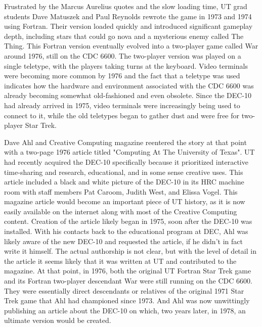 Frustrated by the Marcus Aurelius quotes and the slow loading time, UT grad students Dave Matuszek and Paul Reynolds rewrote the game in 1973 and 1974 using Fortran. Their version loaded quickly and introduced significant gameplay depth, including stars that could go nova and a mysterious enemy called The Thing. This Fortran version eventually evolved into a two-player game called War around 1976, still on the CDC 6600. The two-player version was played on a single teletype, with the players taking turns at the keyboard. Video terminals were becoming more common by 1976 and the fact that a teletype was used indicates how the hardware and environment associated with the CDC 6600 was already becoming somewhat old-fashioned and even obsolete. Since the DEC-10 had already arrived in 1975, video terminals were increasingly being used to connect to it, while the old teletypes began to gather dust and were free for two-player Star Trek.

Dave Ahl and Creative Computing  magazine reentered the story at that point with a two-page 1976 article titled "Computing At The University of Texas". UT had recently acquired the DEC-10 specifically because it prioritized interactive time-sharing and research, educational, and in some sense creative uses. This article included a black and white picture of the DEC-10 in its HRC machine room with staff members Pat Caroom, Judith West, and Elissa Vogel. This magazine article would become an important piece of UT history, as it is now easily available on the internet along with most of the Creative Computing content. Creation of the article likely began in 1975, soon after the DEC-10 was installed. With his contacts back to the educational program at DEC, Ahl was likely aware of the new DEC-10 and requested the article, if he didn’t in fact write it himself. The actual authorship is not clear, but with the level of detail in the article it seems likely that it was written at UT and contributed to the magazine. At that point, in 1976, both the original UT Fortran Star Trek game and its Fortran two-player descendant War were still running on the CDC 6600. They were essentially direct descendants or relatives of the original 1971 Star Trek game that Ahl had championed since 1973. And Ahl was now unwittingly publishing an article about the DEC-10 on which, two years later, in 1978, an ultimate version would be created. \cite{ahlComputingUniversityTexas1976}

